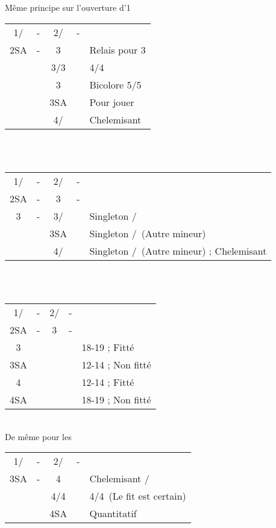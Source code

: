 \documentclass[a4paper, oneside, 11pt]{report}
\begin{document}
		Même principe sur l'ouverture d'1\carreau\\

		\begin{tabular}{cccc|l}
		1\trefle/\carreau & - & 2\trefle/\carreau & - &\\
		2SA & - & 3\trefle && Relais pour 3\carreau\\
		&& 3\carreau/3\coeur && 4\coeur/4\pique\\
		&& 3\pique && Bicolore 5\trefle/5\carreau\\
		&& 3SA && Pour jouer\\
		&& 4\trefle/\carreau && Chelemisant\\
		\end{tabular}\\\\

		\begin{tabular}{cccc|l}
		1\trefle/\carreau & - & 2\trefle/\carreau & - &\\
		2SA & - & 3\trefle & - &\\
		3\carreau & - & 3\coeur/\pique && Singleton \pique/\coeur\\	
		&& 3SA && Singleton \carreau/\trefle\ (Autre mineur)\\
		&& 4\trefle/\carreau && Singleton \carreau/\trefle\ (Autre mineur) ; Chelemisant\\
		\end{tabular}\\\\

		\begin{tabular}{cccc|l}
		1\trefle/\carreau & - & 2\trefle/\carreau & - &\\
		2SA & - & 3\carreau & - &\\
		3\coeur &&&& 18-19 ; Fitté\\
		3SA &&&& 12-14 ; Non fitté\\
		4\coeur &&&& 12-14 ; Fitté\\
		4SA &&&& 18-19 ; Non fitté\\
		\end{tabular}\\
		De même pour les \pique\\

		\begin{tabular}{cccc|l}
		1\trefle/\carreau & - & 2\trefle/\carreau & - &\\
		3SA & - & 4\trefle && Chelemisant \trefle/\carreau\\
		&& 4\carreau/4\coeur && 4\coeur/4\pique\ (Le fit est certain)\\
		&& 4SA && Quantitatif\\
		\end{tabular}\\\\
\end{document}
